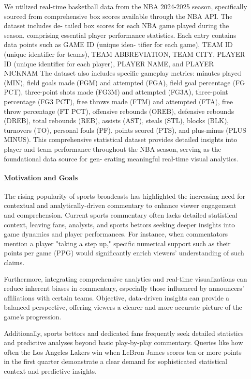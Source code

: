 \documentclass{article}
\begin{document}
We utilized real-time basketball data from the NBA 2024-2025 season, specifically sourced
from comprehensive box scores available through the NBA API. The dataset includes de-
tailed box scores for each NBA game played during the season, comprising essential player
performance statistics. Each entry contains data points such as GAME ID (unique iden-
tifier for each game), TEAM ID (unique identifier for teams), TEAM ABBREVIATION,
TEAM CITY, PLAYER ID (unique identifier for each player), PLAYER NAME, and PLAYER NICKNAM
The dataset also includes specific gameplay metrics: minutes played (MIN), field goals
made (FGM) and attempted (FGA), field goal percentage (FG PCT), three-point shots
made (FG3M) and attempted (FG3A), three-point percentage (FG3 PCT), free throws
made (FTM) and attempted (FTA), free throw percentage (FT PCT), offensive rebounds
(OREB), defensive rebounds (DREB), total rebounds (REB), assists (AST), steals (STL),
blocks (BLK), turnovers (TO), personal fouls (PF), points scored (PTS), and plus-minus
(PLUS MINUS).
This comprehensive statistical dataset provides detailed insights into player and team
performance throughout the NBA season, serving as the foundational data source for gen-
erating meaningful real-time visual analytics.

\paragraph{Motivation and Goals}

The rising popularity of sports broadcasts has highlighted the increasing need for contextual and analytically-driven commentary to enhance viewer engagement and comprehension. Current sports commentary often lacks detailed statistical context, leaving fans, analysts, and sports bettors seeking deeper insights into game dynamics and player performances. For instance, when commentators mention a player "taking a step up," specific numerical support such as their points per game (PPG) would significantly enrich viewers' understanding of such claims.

Furthermore, integrating comprehensive analytics and real-time visualizations can reduce inherent biases in commentary, especially those influenced by announcers' affiliations with certain teams. Objective, data-driven insights can provide a balanced perspective, offering viewers a clearer and more accurate picture of the game's progression.

Additionally, sports bettors and dedicated fans frequently seek detailed statistics and predictive analyses beyond basic play-by-play commentary. Queries like how often the Los Angeles Lakers win when LeBron James scores ten or more points in the first quarter demonstrate a clear demand for sophisticated statistical context and predictive insights.
\end{document}
